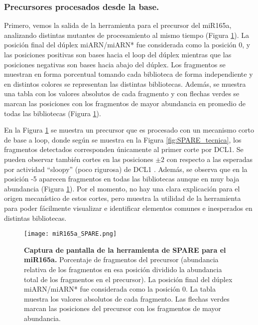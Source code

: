 \subsubsection{Precursores procesados desde la base.}
Primero, vemos la salida de la herramienta para el precursor del  miR165a, analizando distintas mutantes de procesamiento al mismo tiempo (Figura \ref{fig:miR165a_SPARE}).
La posición final del dúplex miARN/miARN* fue considerada como la posición 0, y las posiciones positivas son bases hacia el loop del dúplex mientras que las posiciones negativas son bases hacia abajo del dúplex.
Los fragmentos se muestran en forma porcentual tomando cada biblioteca de forma independiente y en distintos colores se representan las distintas bibliotecas.
Además, se muestra una tabla con los valores absolutos de cada fragmento y con flechas verdes se marcan las posiciones con los fragmentos de mayor abundancia en promedio de todas las bibliotecas (Figura \ref{fig:miR165a_SPARE}).
 
En la Figura \ref{fig:miR165a_SPARE} se muestra un precursor que es procesado con un mecanismo corto de base a loop, donde según se muestra en la Figura \ref{fig:SPARE_tecnica}, los fragmentos detectados corresponden únicamente al primer corte por DCL1.
Se pueden observar también cortes en las posiciones $\pm 2$ con respecto a las esperadas por actividad ``sloopy'' (poco rigurosa) de DCL1 \citep{pmid17989254}.
Además, se observa que en la posición -5 aparecen fragmentos en todas las bibliotecas aunque en muy baja abundancia (Figura \ref{fig:miR165a_SPARE}).
Por el momento, no hay una clara explicación para el origen mecanístico de estos cortes, pero muestra la utilidad de la herramienta para poder fácilmente visualizar e identificar elementos comunes e inesperados en distintas bibliotecas.


\begin{landscape}
    \begin{figure}[htbp!] 
        \centering    
        \texttt{[image: miR165a\_SPARE.png]}
        \caption[Captura de pantalla de la herramienta de SPARE para el miR165a]{
        \textbf{Captura de pantalla de la herramienta de SPARE para el miR165a.}
        Porcentaje de fragmentos del precursor (abundancia relativa de los fragmentos en esa posición dividido la abundancia total de los fragmentos en el precursor).
        La posición final del dúplex miARN/miARN* fue considerada como la posición 0.
        La tabla muestra los valores absolutos de cada fragmento.
        Las flechas verdes marcan las posiciones del precursor con los fragmentos de mayor abundancia. 
        }
         \label{fig:miR165a_SPARE}
    \end{figure}
\end{landscape}

